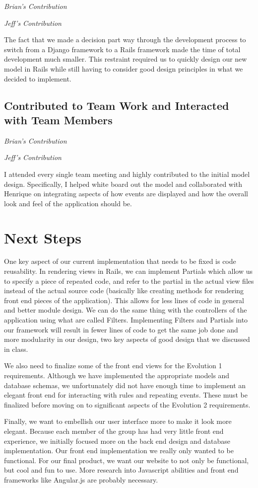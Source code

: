 \documentclass[11pt]{article}
\begin{document}
\textit{Brian's Contribution}



\textit{Jeff's Contribution}

The fact that we made a decision part way through the development process to switch from a Django framework to a Rails framework made the time of total development much smaller.  This restraint required us to quickly design our new model in Rails while still having to consider good design principles in what we decided to implement.

\subsection{Contributed to Team Work and Interacted with Team Members}

\textit{Brian's Contribution}

\textit{Jeff's Contribution}

I attended every single team meeting and highly contributed to the initial model design.  Specifically, I helped white board out the model and collaborated with Henrique on integrating aspects of how events are displayed and how the overall look and feel of the application should be.

\section{Next Steps}

One key aspect of our current implementation that needs to be fixed is code reusability.  In rendering views in Rails, we can implement Partials which allow us to specify a piece of repeated code, and refer to the partial in the actual view files instead of the actual source code (basically like creating methods for rendering front end pieces of the application).  This allows for less lines of code in general and better module design.  We can do the same thing with the controllers of the application using what are called Filters.  Implementing Filters and Partials into our framework will result in fewer lines of code to get the same job done and more modularity in our design, two key aspects of good design that we discussed in class.

We also need to finalize some of the front end views for the Evolution 1 requirements.  Although we have implemented the appropriate models and database schemas, we unfortunately did not have enough time to implement an elegant front end for interacting with rules and repeating events.  These must be finalized before moving on to significant aspects of the Evolution 2 requirements.

Finally, we want to embellish our user interface more to make it look more elegant.  Because each member of the group has had very little front end experience, we initially focused more on the back end design and database implementation.  Our front end implementation we really only wanted to be functional.  For our final product, we want our website to not only be functional, but cool and fun to use.  More research into Javascript abilities and front end frameworks like Angular.js are probably necessary.
\end{document}
